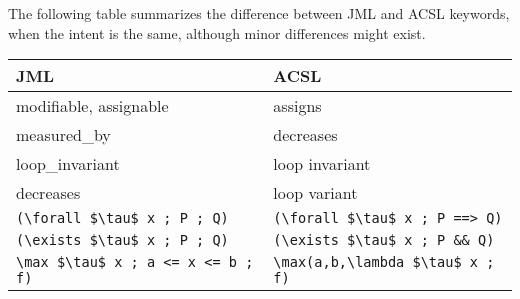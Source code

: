 The following table summarizes the difference between JML and ACSL keywords, when the intent is the same, although minor differences
might exist.
\begin{center}
\begin{tabular}{|l|l|}
\hline
  JML                  & ACSL \\ \hline
  modifiable, assignable           & assigns \\
  measured\_by         & decreases \\
  loop\_invariant      & loop invariant \\
  decreases            & loop variant \\
  \lstinline|(\forall $\tau$ x ; P ; Q)| &
       \lstinline|(\forall $\tau$ x ; P ==> Q)| \\
  \lstinline|(\exists $\tau$ x ; P ; Q)| &
        \lstinline|(\exists $\tau$ x ; P && Q)| \\
  \lstinline|\max $\tau$ x ; a <= x <= b ; f)| &
        \lstinline|\max(a,b,\lambda $\tau$ x ; f)| \\
  \hline
\end{tabular}
\end{center}

